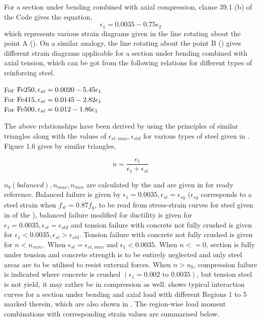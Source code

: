 For a section under bending combined with axial compression, clause
39.1 (b) of the Code gives the equation,
\begin{equation}
\epsilon_1=0.0035-0.75\epsilon_2
\end{equation}
which represents various strain diagrams given in the line rotating about
the point A (). On a similar analogy, the line rotating about the
point B () gives different strain diagrams applicable for a
section under bending combined with axial tension, which can be got from
the following relations for different types of reinforcing steel.

\begin{center}
For $\fetwofivezero,\epsilon_{st}=0.0020-5.45\epsilon_1$\\
For $\fefouronefive,\epsilon_{st}=0.0145-2.82\epsilon_1$\\
For $\fefivezerozero,\epsilon_{st}=0.012-1.86\epsilon_1$
\end{center}

The above relationships have been derived by using the principles of
similar triangles along with the values of $\epsilon_{st,max}, \epsilon_{std}$ for
various types of steel given in . Figure 1.6 gives by
similar triangles,

\begin{equation}
n=\frac{\epsilon_1}{\epsilon_1+\epsilon_{st}}
\end{equation}

$n_b (balanced), n_{max}, n_{min}$ are calculated by the  and are
given in  for ready reference. Balanced failure is given by
$\epsilon_1 = 0.0035, \epsilon_{st} =\epsilon_{sy}$ ($\epsilon_{sy}$
corresponds to a steel strain when $f_{st} = 0.87 f_y$, to be read from
stress-strain curves for steel given in  of the
), balanced failure modified for ductility is given for
$\epsilon_1 = 0.0035, \epsilon_{st} = \epsilon_{std}$ and tension failure
with concrete not fully crushed is given for
$\epsilon_1 < 0.0035, \epsilon_{st} > \epsilon_{std}$. Tension failure 
with concrete not fully crushed is given for
$n < n_{min},\text{ When } \epsilon_{st} = \epsilon_{st,max} \text{ and }
\epsilon_1 < 0.0035. \text{ When } n<= 0$,
section is fully under tension and concrete strength is to be entirely
neglected and only steel areas are to be utilised to resist external
forces. When $n>n_b$, compression failure is indicated where concrete
is crushed $(\epsilon_1= 0.002 \text{ to } 0.0035)$, but tension steel is not
yield, it may rather be in compression as well.  shows typical
interaction curves for a section under bending and axial load with
different Regions 1 to 5 marked therein, which are also shown in .
The region-wise load moment combinations with corresponding strain values
are summarised below.

